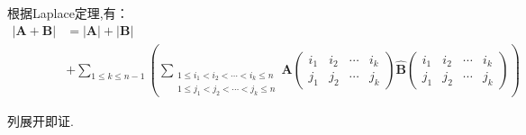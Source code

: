 \begin{green}
\begin{corollary}[矩阵和的行列式]\label{cor:矩阵和的行列式}
    根据\textup{Laplace}定理,有：
    \begin{align*}
    \left|\bm{A}+\bm{B}\right|
    &=
    \left|\bm{A}\right|+\left|\bm{B}\right|
    \\
    &+
    \sum_{1\leqslant k\leqslant n-1}
    \left(
        \sum_{\substack{1\leqslant i_1< i_2<\cdots<i_k\leqslant n
        \\
        1\leqslant j_1<j_2<\cdots<j_k\leqslant n}}
        \bm{A}\begin{pmatrix}
            i_1 & i_2 &\cdots&i_k\\
            j_1 & j_2 & \cdots&j_k
        \end{pmatrix}\widehat{\bm{B}}\begin{pmatrix}
            i_1 & i_2 &\cdots&i_k\\
            j_1 & j_2 & \cdots&j_k
        \end{pmatrix}
    \right)
    \end{align*}
    \end{corollary}
    \begin{Proof}
    列展开即证.
    \end{Proof}
\end{green}
\newpage
